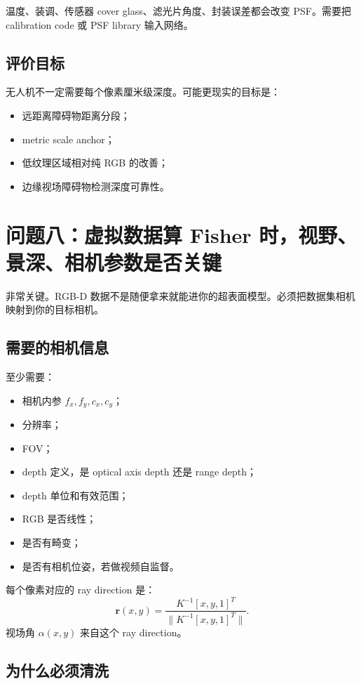 \documentclass[11pt,a4paper,fontset=none]{ctexart}
\begin{document}
温度、装调、传感器 cover glass、滤光片角度、封装误差都会改变 PSF。需要把 calibration code 或 PSF library 输入网络。

\subsection{评价目标}

无人机不一定需要每个像素厘米级深度。可能更现实的目标是：
\begin{itemize}
  \item 远距离障碍物距离分段；
  \item metric scale anchor；
  \item 低纹理区域相对纯 RGB 的改善；
  \item 边缘视场障碍物检测深度可靠性。
\end{itemize}

\section{问题八：虚拟数据算 Fisher 时，视野、景深、相机参数是否关键}

非常关键。RGB-D 数据不是随便拿来就能进你的超表面模型。必须把数据集相机映射到你的目标相机。

\subsection{需要的相机信息}

至少需要：
\begin{itemize}
  \item 相机内参 $f_x,f_y,c_x,c_y$；
  \item 分辨率；
  \item FOV；
  \item depth 定义，是 optical axis depth 还是 range depth；
  \item depth 单位和有效范围；
  \item RGB 是否线性；
  \item 是否有畸变；
  \item 是否有相机位姿，若做视频自监督。
\end{itemize}

每个像素对应的 ray direction 是：
\begin{equation}
  \bm r(x,y)
  =
  \frac{
  K^{-1}[x,y,1]^T
  }{
  \|K^{-1}[x,y,1]^T\|
  }.
\end{equation}
视场角 $\alpha(x,y)$ 来自这个 ray direction。

\subsection{为什么必须清洗}
\end{document}
